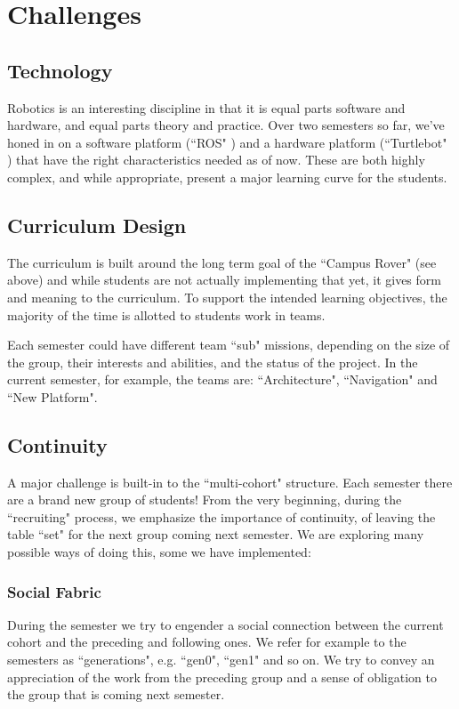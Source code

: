\section{Challenges}

\subsection{Technology} Robotics is an interesting discipline in that it is equal parts software and hardware, and equal parts theory and practice. Over two semesters so far, we’ve honed in on a software platform (``ROS" \cite{ROS}) and a hardware platform (``Turtlebot" \cite{Turtle}) that have the right characteristics needed as of now. These are both highly complex, and while appropriate, present a major learning curve for the students.

\subsection{Curriculum Design} The curriculum is built around the long term goal of the ``Campus Rover" (see above) and while students are not actually implementing that yet, it gives form and meaning to the curriculum. To support the intended learning objectives, the majority of the time is allotted to students work in teams. 

Each semester could have different team ``sub" missions, depending on the size of the group, their interests and abilities, and the status of the project. In the current semester, for example, the teams are: ``Architecture", ``Navigation" and ``New Platform".

\subsection{Continuity}A major challenge is built-in to the ``multi-cohort" structure. Each semester there are a brand new group of students! From the very beginning, during the ``recruiting" process, we emphasize the importance of continuity, of leaving the table ``set" for the next group coming next semester. We are exploring many possible ways of doing this, some we have implemented:
\subsubsection{Social Fabric}During the semester we try to engender a social connection between the current cohort and the preceding and following ones. We refer for example to the semesters as ``generations", e.g. ``gen0", ``gen1" and so on. We try to convey an appreciation of the work from the preceding group and a sense of obligation to the group that is coming next semester.
